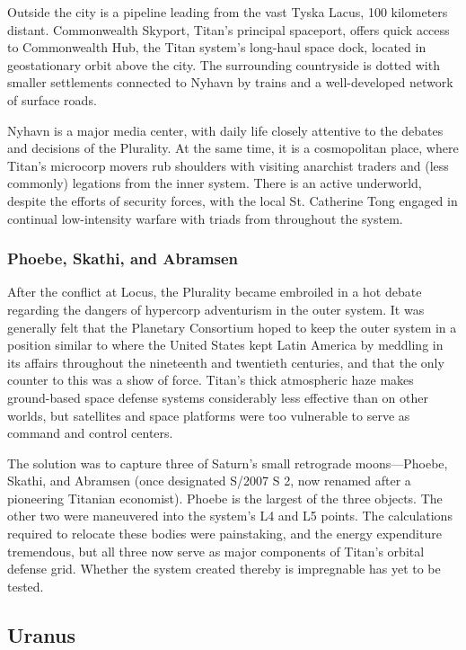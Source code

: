 Outside the city is a pipeline leading from the vast Tyska Lacus, 100 kilometers distant. Commonwealth Skyport, Titan's principal spaceport, offers quick access to Commonwealth Hub, the Titan system's long-haul space dock, located in geostationary orbit above the city. The surrounding countryside is dotted with smaller settlements connected to Nyhavn by trains and a well-developed network of surface roads. 

Nyhavn is a major media center, with daily life closely attentive to the debates and decisions of the Plurality. At the same time, it is a cosmopolitan place, where Titan's microcorp movers rub shoulders with visiting anarchist traders and (less commonly) legations from the inner system. There is an active underworld, despite the efforts of security forces, with the local St. Catherine Tong engaged in continual low-intensity warfare with triads from throughout the system. 

\subsubsection{Phoebe, Skathi, and Abramsen} \label{sec:phoebe-skathi-abrams} 

After the conflict at Locus, the Plurality became embroiled in a hot debate regarding the dangers of hypercorp adventurism in the outer system. It was generally felt that the Planetary Consortium hoped to keep the outer system in a position similar to where the United States kept Latin America by meddling in its affairs throughout the nineteenth and twentieth centuries, and that the only counter to this was a show of force. Titan's thick atmospheric haze makes ground-based space defense systems considerably less effective than on other worlds, but satellites and space platforms were too vulnerable to serve as command and control centers. 

The solution was to capture three of Saturn's small retrograde moons—Phoebe, Skathi, and Abramsen (once designated S/2007 S 2, now renamed after a pioneering Titanian economist). Phoebe is the largest of the three objects. The other two were maneuvered into the system's L4 and L5 points. The calculations required to relocate these bodies were painstaking, and the energy expenditure tremendous, but all three now serve as major components of Titan's orbital defense grid. Whether the system created thereby is impregnable has yet to be tested. 

\subsection{Uranus} \label{sec:uranus} 

